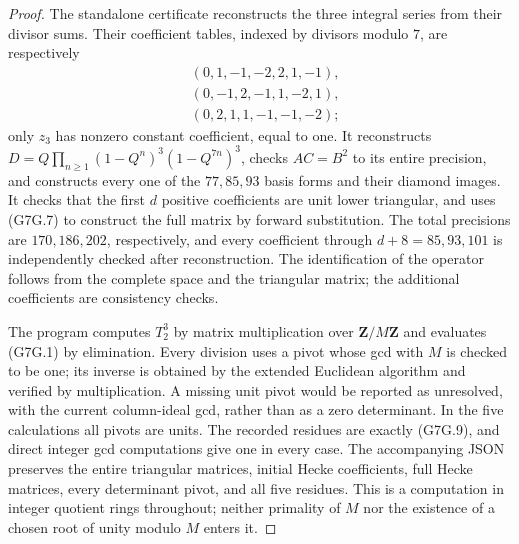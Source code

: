 \begin{proof}
The standalone certificate
reconstructs the three integral series from their divisor sums.
Their coefficient tables, indexed by divisors modulo \(7\),
are respectively
\[
\begin{split}
 &(0,1,-1,-2,2,1,-1),\\
 &(0,-1,2,-1,1,-2,1),\\
 &(0,2,1,1,-1,-1,-2);
\end{split}
\]
only \(z_3\) has nonzero constant coefficient, equal to one.
It reconstructs
\(D=Q\prod_{n\ge1}(1-Q^n)^3(1-Q^{7n})^3\),
checks \(AC=B^2\) to its entire precision, and constructs every
one of the \(77,85,93\) basis forms and their diamond images.
It checks that the first \(d\) positive coefficients are
unit lower triangular, and uses (G7G.7) to construct the full
matrix by forward substitution. The total precisions are
\(170,186,202\), respectively, and every coefficient through
\(d+8=85,93,101\) is independently checked after reconstruction.
The identification of the operator follows from the complete
space and the triangular matrix; the additional coefficients
are consistency checks.

The program computes \(T_2^3\) by matrix multiplication over
\(\mathbf Z/M\mathbf Z\) and evaluates (G7G.1) by elimination.
Every division uses a pivot whose gcd with \(M\) is checked
to be one; its inverse is obtained by the extended Euclidean
algorithm and verified by multiplication. A missing unit pivot
would be reported as unresolved, with the current column-ideal
gcd, rather than as a zero determinant. In the five calculations
all pivots are units. The recorded residues are exactly
(G7G.9), and direct integer gcd computations give one in
every case. The accompanying JSON preserves the entire
triangular matrices, initial Hecke coefficients, full Hecke
matrices, every determinant pivot, and all five residues.
This is a computation in integer quotient rings throughout;
neither primality of \(M\) nor the existence of a chosen
root of unity modulo \(M\) enters it.
\end{proof}
